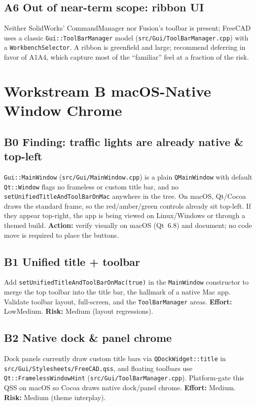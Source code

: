 \documentclass[11pt]{article}
\begin{document}
\subsection{A6 \textemdash{} Out of near-term scope: ribbon UI}
Neither SolidWorks' CommandManager nor Fusion's toolbar is present; FreeCAD uses a
classic \texttt{Gui::ToolBarManager} model (\texttt{src/Gui/ToolBarManager.cpp}) with a
\texttt{WorkbenchSelector}. A ribbon is greenfield and large; recommend deferring in
favor of A1\textendash A4, which capture most of the ``familiar'' feel at a fraction of
the risk.

\section{Workstream B \; \; macOS-Native Window Chrome}

\subsection{B0 \textemdash{} Finding: traffic lights are already native \& top-left}
\texttt{Gui::MainWindow} (\texttt{src/Gui/MainWindow.cpp}) is a plain \texttt{QMainWindow} with
default \texttt{Qt::Window} flags \textemdash{} no frameless or custom title bar, and no
\texttt{setUnifiedTitleAndToolBarOnMac} anywhere in the tree. On macOS, Qt/Cocoa draws
the standard frame, so the red/amber/green controls already sit top-left. If they
appear top-right, the app is being viewed on Linux/Windows or through a themed
build. \textbf{Action:} verify visually on macOS (Qt~6.8) and document; no code move
is required to place the buttons.

\subsection{B1 \textemdash{} Unified title + toolbar}
Add \texttt{setUnifiedTitleAndToolBarOnMac(true)} in the \texttt{MainWindow} constructor to
merge the top toolbar into the title bar, the hallmark of a native Mac app.
Validate toolbar layout, full-screen, and the \texttt{ToolBarManager} areas.
\textbf{Effort:} Low\textendash Medium. \quad\textbf{Risk:} Medium (layout regressions).

\subsection{B2 \textemdash{} Native dock \& panel chrome}
Dock panels currently draw custom title bars via \texttt{QDockWidget::title} in
\texttt{src/Gui/Stylesheets/FreeCAD.qss}, and floating toolbars use
\texttt{Qt::FramelessWindowHint} (\texttt{src/Gui/ToolBarManager.cpp}). Platform-gate this
QSS on macOS so Cocoa draws native dock/panel chrome.
\textbf{Effort:} Medium. \quad\textbf{Risk:} Medium (theme interplay).
\end{document}
